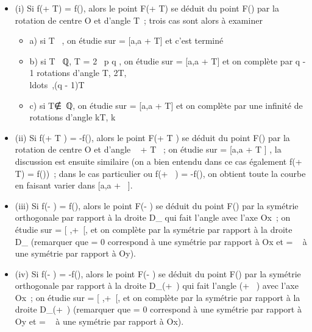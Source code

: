 \documentclass[]{article}
\begin{document}
\begin{itemize}
\itemsep1pt\parskip0pt
\item
  (i) Si f(\theta + T) = f(\theta), alors le point F(\theta + T) se déduit du point
  F(\theta) par la rotation de centre O et d'angle T~; trois cas sont alors à
  examiner

  \begin{itemize}
  \itemsep1pt\parskip0pt
  \item
    a) si T \pi~, on étudie sur \Delta = {[}a,a + T{]} \bigcapD et c'est terminé
  \item
    b) si T \in \pi~ℚ, T = 2\pi~ p \over q , on étudie sur \Delta
    = {[}a,a + T{]} \bigcapD et on complète par q - 1 rotations d'angle T,
    2T,\\ldots~,(q -
    1)T
  \item
    c) si T∉\pi~ℚ, on étudie sur \Delta = {[}a,a +
    T{]} \bigcapD et on complète par une infinité de rotations d'angle kT, k \in
  \end{itemize}
\item
  (ii) Si f(\theta + T  ) = -f(\theta), alors le point
  F(\theta + T  ) se déduit du point F(\theta) par la
  rotation de centre O et d'angle \pi~ + T  ~; on
  étudie sur \Delta = {[}a,a + T  {]} \bigcapD, la
  discussion est ensuite similaire (on a bien entendu dans ce cas
  également f(\theta + T) = f(\theta))~; dans le cas particulier ou f(\theta + \pi~) =
  -f(\theta), on obtient toute la courbe en faisant varier \theta dans {[}a,a +
  \pi~{]}.
\item
  (iii) Si f(\omega - \theta) = f(\theta), alors le point F(\omega - \theta) se déduit du point
  F(\theta) par la symétrie orthogonale par rapport à la droite
  D_\omega{} qui fait l'angle \omega{} avec l'axe Ox~; on étudie sur \Delta =
  {[} \omega {} ,+\infty~{[}\bigcapD, et on complète par la
  symétrie par rapport à la droite D_\omega{} (remarquer que \omega = 0
  correspond à une symétrie par rapport à Ox et \omega = \pi~ à une symétrie par
  rapport à Oy).
\item
  (iv) Si f(\omega - \theta) = -f(\theta), alors le point F(\omega - \theta) se déduit du point
  F(\theta) par la symétrie orthogonale par rapport à la droite
  D_(\omega+\pi~) qui fait l'angle (\omega + \pi~) avec l'axe Ox~; on
  étudie sur \Delta = {[} \omega {} ,+\infty~{[}\bigcapD, et on
  complète par la symétrie par rapport à la droite D_(\omega+\pi~)
  (remarquer que \omega = 0 correspond à une symétrie par rapport à Oy et \omega =
  \pi~ à une symétrie par rapport à Ox).
\end{itemize}
\end{document}

